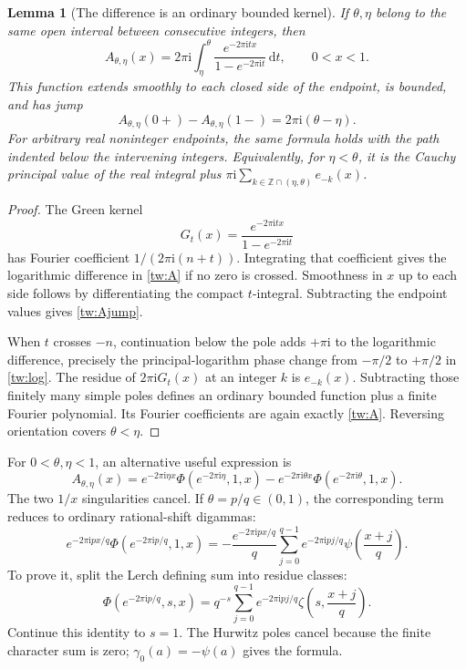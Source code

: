 \documentclass[11pt,a4paper]{article}
\numberwithin{equation}{section}
\newtheorem{lemma}[theorem]{Lemma}
\theoremstyle{definition}
\theoremstyle{remark}
\newcommand{\Z}{\mathbb Z}
\newcommand{\ii}{\mathrm i}
\newcommand{\dd}{\,\mathrm d}
\begin{document}
\begin{lemma}[The difference is an ordinary bounded kernel]
\label{tw:bounded}
If $\theta,\eta$ belong to the same open interval between consecutive
integers, then
\begin{equation}
 A_{\theta,\eta}(x)=2\pi\ii\int_\eta^\theta
       \frac{e^{-2\pi\ii t x}}{1-e^{-2\pi\ii t}}\dd t,
       \qquad 0<x<1.
 \label{tw:Aintegral}
\end{equation}
This function extends smoothly to each closed side of the endpoint,
is bounded, and has jump
\begin{equation}
 A_{\theta,\eta}(0+)-A_{\theta,\eta}(1-)
                    =2\pi\ii(\theta-\eta).
 \label{tw:Ajump}
\end{equation}
For arbitrary real noninteger endpoints, the same formula holds with
the path indented below the intervening integers. Equivalently, for
$\eta<\theta$, it is the Cauchy principal value of the real integral
plus $\pi\ii\sum_{k\in\Z\cap(\eta,\theta)}e_{-k}(x)$.
\end{lemma}

\begin{proof}
The Green kernel
\begin{equation}
 G_t(x)=\frac{e^{-2\pi\ii t x}}{1-e^{-2\pi\ii t}}
 \label{tw:G}
\end{equation}
has Fourier coefficient $1/(2\pi\ii(n+t))$. Integrating that
coefficient gives the logarithmic difference in \eqref{tw:A} if
no zero is crossed. Smoothness in $x$ up to each side follows by
differentiating the compact $t$-integral. Subtracting the endpoint
values gives \eqref{tw:Ajump}.

When $t$ crosses $-n$, continuation below the pole adds $+\pi\ii$
to the logarithmic difference, precisely the principal-logarithm phase
change from $-\pi/2$ to $+\pi/2$ in \eqref{tw:log}.
The residue of $2\pi\ii G_t(x)$ at an integer $k$ is $e_{-k}(x)$.
Subtracting those finitely many simple poles defines an ordinary bounded
function plus a finite Fourier polynomial. Its Fourier coefficients
are again exactly \eqref{tw:A}. Reversing orientation covers
$\theta<\eta$.
\end{proof}

For $0<\theta,\eta<1$, an alternative useful expression is
\begin{equation}
 A_{\theta,\eta}(x)
 =e^{-2\pi\ii\eta x}\Phi(e^{-2\pi\ii\eta},1,x)
  -e^{-2\pi\ii\theta x}\Phi(e^{-2\pi\ii\theta},1,x).
 \label{tw:ALerch}
\end{equation}
The two $1/x$ singularities cancel. If $\theta=p/q\in(0,1)$,
the corresponding term reduces to ordinary rational-shift digammas:
\begin{equation}
 e^{-2\pi\ii px/q}\Phi(e^{-2\pi\ii p/q},1,x)
 =-\frac{e^{-2\pi\ii px/q}}q
      \sum_{j=0}^{q-1}e^{-2\pi\ii pj/q}
                          \psi\left(\frac{x+j}{q}\right).
 \label{tw:rational}
\end{equation}
To prove it, split the Lerch defining sum into residue classes:
\[
 \Phi(e^{-2\pi\ii p/q},s,x)
   =q^{-s}\sum_{j=0}^{q-1}e^{-2\pi\ii pj/q}
                          \zeta\left(s,\frac{x+j}{q}\right).
\]
Continue this identity to $s=1$. The Hurwitz poles cancel because the finite character sum is
zero; $\gamma_0(a)=-\psi(a)$ gives the formula.
\end{document}
